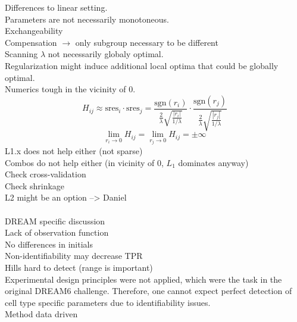 \documentclass{bioinfo}
\begin{document}
Differences to linear setting.\\
Parameters are not necessarily monotoneous.\\
Exchangeability\\
Compensation $\rightarrow$ only subgroup necessary to be different\\
Scanning $\lambda$ not necessarily globaly optimal.\\
Regularization might induce additional local optima that could be globally optimal.\\
Numerics tough in the vicinity of 0.\\
\begin{equation}
	H_{ij} \approx \text{sres}_i \cdot \text{sres}_j = \frac{\text{sgn}(r_i)}{\frac{2}{\lambda}\sqrt{\frac{|r_i|}{1/\lambda}}} \cdot \frac{\text{sgn}(r_j)}{\frac{2}{\lambda}\sqrt{\frac{|r_j|}{1/\lambda}}}
\end{equation}
\begin{equation}
	\lim_{r_i \rightarrow 0} H_{ij} = \lim_{r_j \rightarrow 0} H_{ij} = \pm \infty
\end{equation}
L1.x does not help either (not sparse)\\
Combos do not help either (in vicinity of 0, $L_1$ dominates anyway)\\
Check cross-validation\\
Check shrinkage\\
L2 might be an option --> Daniel\\ \\
DREAM specific discussion\\
Lack of observation function\\
No differences in initials\\
Non-identifiability may decrease TPR\\
Hills hard to detect (range is important)\\
Experimental design principles were not applied, which were the task in the original DREAM6 challenge. Therefore, one cannot expect perfect detection of cell type specific parameters due to identifiability issues.\\
Method data driven
\end{document}
